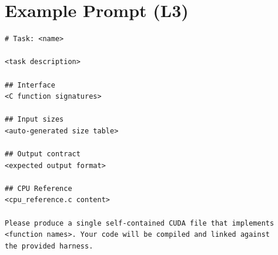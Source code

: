 \documentclass{article}
\begin{document}
\section{Example Prompt (L3)}
\label{app:prompt}

\begin{lstlisting}[style=cuda,caption={Canonical L3 prompt structure.}]
# Task: <name>

<task description>

## Interface
<C function signatures>

## Input sizes
<auto-generated size table>

## Output contract
<expected output format>

## CPU Reference
<cpu_reference.c content>

Please produce a single self-contained CUDA file that implements
<function names>. Your code will be compiled and linked against
the provided harness.
\end{lstlisting}
\end{document}
